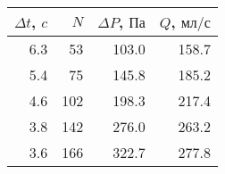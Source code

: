 \begin{tabular}{rrrr}
\toprule
$\Delta t$, $c$ & $N$ & $\Delta P$, $Па$ & $Q$, $мл/с$ \\
\midrule
6.3 & 53 & 103.0 & 158.7 \\
5.4 & 75 & 145.8 & 185.2 \\
4.6 & 102 & 198.3 & 217.4 \\
3.8 & 142 & 276.0 & 263.2 \\
3.6 & 166 & 322.7 & 277.8 \\
\bottomrule
\end{tabular}

